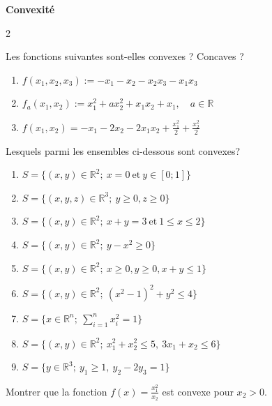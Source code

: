 
\begin{center}
	\textbf{{\large Convexité}}
\end{center}
\begin{multicols}{2}

\begin{exercice}
	Les fonctions suivantes sont-elles convexes ? Concaves ?
	\begin{enumerate}
		\item \( f(x_1, x_2, x_3) := -x_1 - x_2 - x_2x_3 - x_1x_3 \)
		\item \( f_a(x_1, x_2) := x_1^2 + a x_2^2 + x_1x_2 + x_1, \quad a \in \mathbb{R} \)
		\item \( f(x_1, x_2) = -x_1 - 2x_2 - 2x_1x_2 + \frac{x_1^2}{2} + \frac{x_2^2}{2} \)
	\end{enumerate}
\end{exercice}

\begin{exercice}
	Lesquels parmi les ensembles ci-dessous sont convexes?
	\begin{enumerate}[label=\arabic*.]
		\item \( S = \{(x, y) \in \mathbb{R}^2; \ x = 0 \ \text{et} \ y \in [0; 1]\} \)
		\item \( S = \{(x, y, z) \in \mathbb{R}^3; \ y \geq 0, z \geq 0\} \)
		\item \( S = \{(x, y) \in \mathbb{R}^2; \ x + y = 3 \ \text{et} \ 1 \leq x \leq 2\} \)
		\item \( S = \{(x, y) \in \mathbb{R}^2; \ y - x^2 \geq 0\} \)
		\item \( S = \{(x, y) \in \mathbb{R}^2; \ x \geq 0, y \geq 0, x + y \leq 1\} \)
		\item \( S = \{(x, y) \in \mathbb{R}^2; \ (x^2 - 1)^2 + y^2 \leq 4\} \)
		\item \( S = \{x \in \mathbb{R}^n; \ \sum_{i=1}^n x_i^2 = 1\} \)
		\item \( S = \{(x, y) \in \mathbb{R}^2; \ x_1^2 + x_2^2 \leq 5, \ 3x_1 + x_2 \leq 6\} \)
		\item \( S = \{y \in \mathbb{R}^3; \ y_1 \geq 1, \ y_2 - 2y_3 = 1\} \)
	\end{enumerate}
\end{exercice}

\begin{exercice}
	Montrer que la fonction $f(x) = \frac{x_{1}^{2}}{x_{2}}$ est convexe pour $x_{2} > 0$.
\end{exercice}


\end{multicols}
